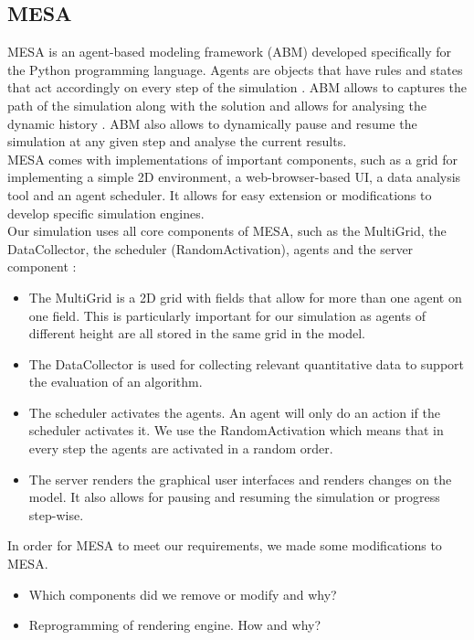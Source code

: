 \subsection{MESA}
MESA \cite{masad.2015} is an agent-based modeling framework (ABM) developed specifically for the Python programming language.  Agents are objects that have rules and states that act accordingly on every step of the simulation \cite{axtell.2000}. ABM allows to captures the path of the simulation along with the solution and allows for analysing the dynamic history \cite{axtell.2000}. ABM also allows to dynamically pause and resume the simulation at any given step and analyse the current results.\\
MESA comes with implementations of important components, such as a grid for implementing a simple 2D environment, a web-browser-based UI, a data analysis tool and an agent scheduler. It allows for easy extension or modifications to develop specific simulation engines. \\
Our simulation uses all core components of MESA, such as the MultiGrid, the DataCollector, the scheduler (RandomActivation), agents and the server component \cite{masad.2015}:
\begin{itemize}
	\item The MultiGrid is a 2D grid with fields that allow for more than one agent on one field. This is particularly important for our simulation as agents of different height are all stored in the same grid in the model.
	\item The DataCollector is used for collecting relevant quantitative data to support the evaluation of an algorithm.
	\item The scheduler activates the agents. An agent will only do an action if the scheduler activates it. We use the RandomActivation which means that in every step the agents are activated in a random order.
	\item The server renders the graphical user interfaces and renders changes on the model. It also allows for pausing and resuming the simulation or progress step-wise.
\end{itemize} 
In order for MESA to meet our requirements, we made some modifications to MESA.


\begin{itemize}
	\item Which components did we remove or modify and why?
	\item Reprogramming of rendering engine. How and why?
\end{itemize}


